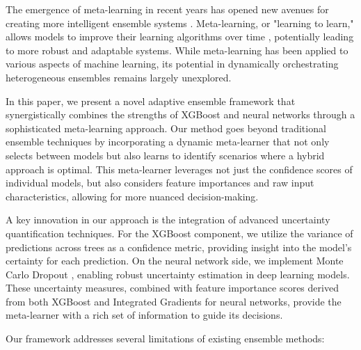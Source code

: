 \documentclass[10pt,journal,compsoc]{IEEEtran}
\begin{document}
The emergence of meta-learning in recent years has opened new avenues for creating more intelligent ensemble systems \cite{vanschoren2018meta,zhang2021survey}. Meta-learning, or "learning to learn," allows models to improve their learning algorithms over time \cite{finn2017model,snell2017prototypical}, potentially leading to more robust and adaptable systems. While meta-learning has been applied to various aspects of machine learning, its potential in dynamically orchestrating heterogeneous ensembles remains largely unexplored.

In this paper, we present a novel adaptive ensemble framework that synergistically combines the strengths of XGBoost and neural networks through a sophisticated meta-learning approach. Our method goes beyond traditional ensemble techniques by incorporating a dynamic meta-learner that not only selects between models but also learns to identify scenarios where a hybrid approach is optimal. This meta-learner leverages not just the confidence scores of individual models, but also considers feature importances and raw input characteristics, allowing for more nuanced decision-making.

A key innovation in our approach is the integration of advanced uncertainty quantification techniques. For the XGBoost component, we utilize the variance of predictions across trees as a confidence metric, providing insight into the model's certainty for each prediction. On the neural network side, we implement Monte Carlo Dropout \cite{gal2016dropout}, enabling robust uncertainty estimation in deep learning models. These uncertainty measures, combined with feature importance scores derived from both XGBoost and Integrated Gradients \cite{sundararajan2017axiomatic} for neural networks, provide the meta-learner with a rich set of information to guide its decisions.

Our framework addresses several limitations of existing ensemble methods:
\end{document}
